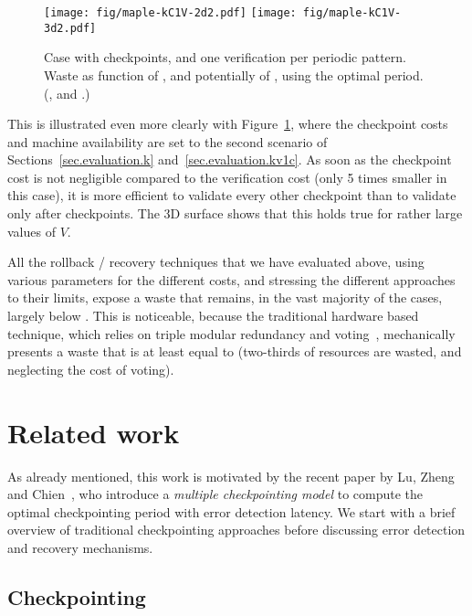 \documentclass[10pt,table]{article}
\newcommand{\ema}[1]{\ensuremath{#1}\xspace}
\newcommand{\vvv}{\ema{V}}
\begin{document}
\begin{figure}
\begin{center}
\texttt{[image: fig/maple-kC1V-2d2.pdf]}
\texttt{[image: fig/maple-kC1V-3d2.pdf]}
\caption{Case with  checkpoints, and one verification per periodic
  pattern. Waste as function of , and potentially of , using the
  optimal period.  \footnotesize{(,
    and .)}
\label{fig:maple:kC1V2}\vspace{-2\baselineskip}}
\end{center}
\end{figure}

This is illustrated even more clearly with Figure~\ref{fig:maple:kC1V2}, 
where the checkpoint costs and machine
availability are set to the second scenario of 
Sections~\ref{sec.evaluation.k} and~\ref{sec.evaluation.kv1c}. 
As soon as the checkpoint cost is not negligible compared to
the verification cost (only 5 times smaller in this case), it is more
efficient to validate every other checkpoint than to validate only after
 checkpoints. The 3D surface shows
that this holds true for rather large values of \vvv.

All the rollback / recovery techniques that we
have evaluated above, using various parameters for the different
costs, and stressing the different approaches to their limits,
expose a waste that remains, in the vast majority of the cases,
largely below . This is noticeable, because the traditional
hardware based technique, which relies on triple modular redundancy
and voting~\cite{Lyons1962}, mechanically presents  a waste that is at least
equal to  (two-thirds of resources are wasted, and neglecting the cost of voting).

\section{Related work}
\label{sec.related}

As already mentioned, this work is motivated by the recent paper by 
Lu, Zheng and Chien~\cite{LuZhengChien2013}, who introduce a \emph{multiple checkpointing model} 
to compute the optimal checkpointing period with error detection latency. 
We start with a brief overview of traditional checkpointing approaches
before discussing error detection and recovery mechanisms. 

\subsection{Checkpointing}
\end{document}
